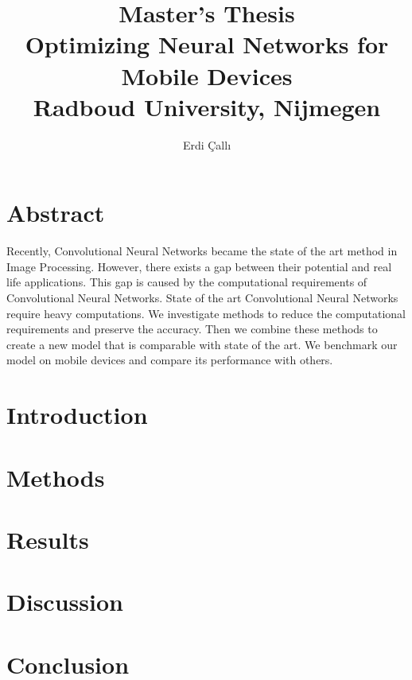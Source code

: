 \documentclass[12pt]{report}
\title{
{\textbf{Master's Thesis}\\Optimizing Neural Networks for Mobile Devices}\\
{\large Radboud University, Nijmegen}
}
\author{Erdi \c{C}all{\i}}
\begin{document}
\maketitle
\chapter*{Abstract}
Recently, Convolutional Neural Networks became the state of the art method in Image Processing. However, there exists a gap between their potential and real life applications. This gap is caused by the computational requirements of Convolutional Neural Networks. State of the art Convolutional Neural Networks require heavy computations. We investigate methods to reduce the computational requirements and preserve the accuracy. Then we combine these methods to create a new model that is comparable with state of the art. We benchmark our model on mobile devices and compare its performance with others.



\tableofcontents

\chapter{Introduction}


\chapter{Methods}


\chapter{Results}


\chapter{Discussion}


\chapter{Conclusion}




\end{document}
